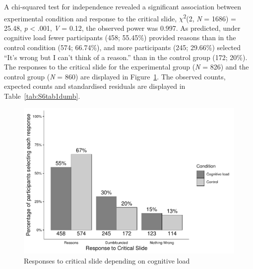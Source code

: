 \documentclass[
  american,
  man,floatsintext]{apa7}
\begin{document}
A chi-squared test for independence revealed a significant association between experimental condition and response to the critical slide, \(\chi\)\textsuperscript{2}(2, \emph{N} = 1686) = 25.48, \emph{p} \textless{} .001, \emph{V} = 0.12, the observed power was 0.997. As predicted, under cognitive load fewer participants (458; 55.45\%) provided reasons than in the control condition (574; 66.74\%), and more participants (245; 29.66\%) selected \enquote{It's wrong but I can't think of a reason.} than in the control group (172; 20\%). The responses to the critical slide for the experimental group (\emph{N} = 826) and the control group (\emph{N} = 860) are displayed in Figure~\ref{fig:S6ch5S6fig1criticalconditionb}. The observed counts, expected counts and standardised residuals are displayed in Table~\ref{tab:S6tab1dumb}.

\newpage

\begin{figure}
\centering
\includegraphics{cog_load_in_chunks_files/figure-latex/S6ch5S6fig1criticalconditionb-1.pdf}
\caption{\label{fig:S6ch5S6fig1criticalconditionb}Responses to critical slide depending on cognitive load}
\end{figure}
\end{document}
